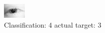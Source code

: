 \begin{figure}[h!]
\begin{center}
\includegraphics[width=0.60\columnwidth]{figures/ID64_class_4_target_3.png}
\end{center}
\caption{ Classification: 4 actual target: 3}
\label{fig:ID64_class_4_target_3}
\end{figure}
